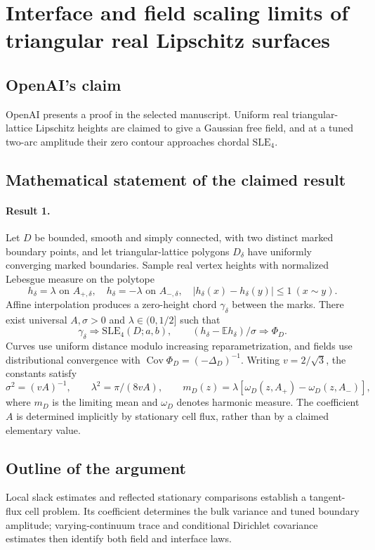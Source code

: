\documentclass[11pt]{article}
\begin{document}
\section*{Interface and field scaling limits of triangular real Lipschitz surfaces}

\subsection{OpenAI's claim}
OpenAI presents a proof in the selected manuscript. Uniform real triangular-lattice Lipschitz heights are claimed to give a Gaussian free field, and at a tuned two-arc amplitude their zero contour approaches chordal $\mathrm{SLE}_4$.

\subsection{Mathematical statement of the claimed result}
\paragraph{Result 1.} Let $D$ be bounded, smooth and simply connected, with two distinct marked boundary points, and let triangular-lattice polygons $D_\delta$ have uniformly converging marked boundaries. Sample real vertex heights with normalized Lebesgue measure on the polytope
\[
 h_\delta=\lambda\text{ on }A_{+,\delta},\quad h_\delta=-\lambda\text{ on }A_{-,\delta},\quad
 |h_\delta(x)-h_\delta(y)|\le1\ (x\sim y).
\]
Affine interpolation produces a zero-height chord $\gamma_\delta$ between the marks. There exist universal $A,\sigma>0$ and $\lambda\in(0,1/2]$ such that
\[
 \gamma_\delta\Longrightarrow\mathrm{SLE}_4(D;a,b),\qquad
 (h_\delta-\mathbb Eh_\delta)/\sigma\Longrightarrow\Phi_D.
\]
Curves use uniform distance modulo increasing reparametrization, and fields use distributional convergence with $\operatorname{Cov}\Phi_D=(-\Delta_D)^{-1}$. Writing $v=2/\sqrt3$, the constants satisfy
\[
 \sigma^2=(vA)^{-1},\qquad \lambda^2=\pi/(8vA),\qquad
 m_D(z)=\lambda[\omega_D(z,A_+)-\omega_D(z,A_-)],
\]
where $m_D$ is the limiting mean and $\omega_D$ denotes harmonic measure. The coefficient $A$ is determined implicitly by stationary cell flux, rather than by a claimed elementary value.

\subsection{Outline of the argument}
Local slack estimates and reflected stationary comparisons establish a tangent-flux cell problem. Its coefficient determines the bulk variance and tuned boundary amplitude; varying-continuum trace and conditional Dirichlet covariance estimates then identify both field and interface laws.
\end{document}

